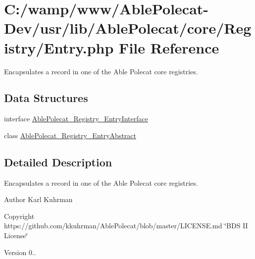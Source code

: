 \hypertarget{_entry_8php}{}\section{C\+:/wamp/www/\+Able\+Polecat-\/\+Dev/usr/lib/\+Able\+Polecat/core/\+Registry/\+Entry.php File Reference}
\label{_entry_8php}


Encapsulates a record in one of the Able Polecat core registries.  


\subsection*{Data Structures}
\begin{DoxyCompactItemize}
\item 
interface \hyperlink{interface_able_polecat___registry___entry_interface}{Able\+Polecat\+\_\+\+Registry\+\_\+\+Entry\+Interface}
\item 
class \hyperlink{class_able_polecat___registry___entry_abstract}{Able\+Polecat\+\_\+\+Registry\+\_\+\+Entry\+Abstract}
\end{DoxyCompactItemize}


\subsection{Detailed Description}
Encapsulates a record in one of the Able Polecat core registries. 

\begin{DoxyAuthor}{Author}
Karl Kuhrman 
\end{DoxyAuthor}
\begin{DoxyCopyright}{Copyright}
https\+://github.com/kkuhrman/\+Able\+Polecat/blob/master/\+L\+I\+C\+E\+N\+S\+E.\+md \char`\"{}\+B\+D\+S I\+I License\char`\"{} 
\end{DoxyCopyright}
\begin{DoxyVersion}{Version}
0.. 
\end{DoxyVersion}
